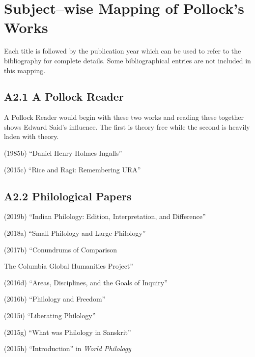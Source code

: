 
\chapter{Subject–wise Mapping of Pollock’s Works}\label{chapter8}

Each title is followed by the publication year which can be used to refer to the bibliography for complete details. Some bibliographical entries are not included in this mapping.

\section*{A2.1 A Pollock Reader}

A Pollock Reader would begin with these two works and reading these together shows Edward Said’s influence. The first is theory free while the second is heavily laden with theory.

\item (1985b) “Daniel Henry Holmes Ingalls”

 \item (2015c) “Rice and Ragi: Remembering URA”



\section*{A2.2 Philological Papers}

\item (2019b) “Indian Philology: Edition, Interpretation, and Difference”

 \item (2018a) “Small Philology and Large Philology”

 \item (2017b) “Conundrums of Comparison

 \item The Columbia Global Humanities Project”

 \item (2016d) “Areas, Disciplines, and the Goals of Inquiry”

 \item (2016b) “Philology and Freedom”

 \item (2015i) “Liberating Philology”

 \item (2015g) “What was Philology in Sanskrit”

 \item (2015h) “Introduction” in \textit{World Philology}

